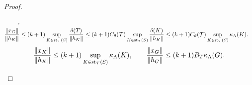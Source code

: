\documentclass[10pt,a4paper]{article}
\begin{document}
\begin{proof}
\begin{itemize}
\begin{align*}
            ,
            \\
            \frac{ \| x_{G} \| }{ \| h_{K} \| }
            &\leq 
            (k+1)
            \sup_{ K \in \patch_{\calT}(S) }
            \frac{ \diam(T) }{ \| h_{K} \| }
            \leq 
            (k+1)
            \diameterratio(\calT)
            \sup_{ K \in \patch_{\calT}(S) }
            \frac{ \diam(K) }{ \| h_{K} \| }
            \leq 
            (k+1)
            \diameterratio(\calT)
            \sup_{ K \in \patch_{\calT}(S) }
            \aspectratio(K) %
            .
        \end{align*}
        \begin{gather*}
            \frac{ \| x_{K} \| }{ \| h_{{K}} \| }
            \leq 
            (k+1)
            \sup_{ K \in \patch_{\calT}(S) }
            \aspectratio(K) %
            ,
            \qquad 
            \frac{ \| x_{G} \| }{ \| h_{G} \| }
            \leq 
            (k+1)B_{T}
            \aspectratio({G}) %
            .
        \end{gather*}

        
        

\end{itemize}
\end{proof}
\end{document}
